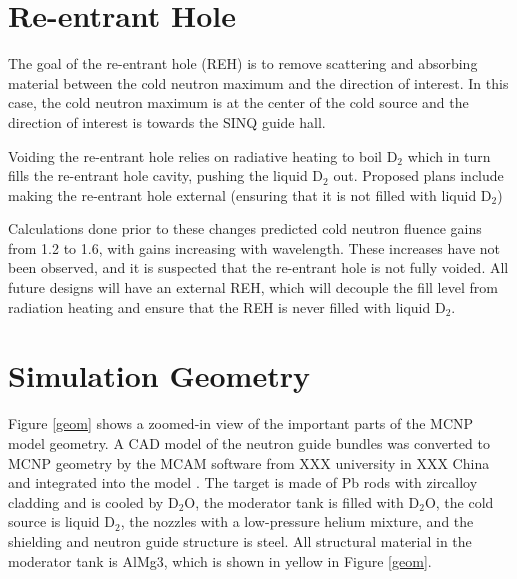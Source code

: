 \documentclass[a4paper]{jpconf}
\begin{document}
\section{Re-entrant Hole}

The goal of the re-entrant hole (REH) is to remove scattering and absorbing material between the cold neutron maximum and the direction of interest.  In this case, the cold neutron maximum is at the center of the cold source and the direction of interest is towards the SINQ guide hall.  

Voiding the re-entrant hole relies on radiative heating to boil D$_2$ which in turn fills the re-entrant hole cavity, pushing the liquid D$_2$ out.  Proposed plans include making the re-entrant hole external (ensuring that it is not filled with liquid D$_2$)

Calculations done prior to these changes predicted cold neutron fluence gains from 1.2 to 1.6, with gains increasing with wavelength. These increases have not been observed, and it is suspected that the re-entrant hole is not fully voided.  All future designs will have an external REH, which will decouple the fill level from radiation heating and ensure that the REH is never filled with liquid D$_2$.

\section{Simulation Geometry}

Figure \ref{geom} shows a zoomed-in view of the important parts of the MCNP model geometry.  A CAD model of the neutron guide bundles was converted to MCNP geometry by the MCAM software from XXX university in XXX China and integrated into the model \cite{mcam}.  The target is made of Pb rods with zircalloy cladding and is cooled by D$_2$O, the moderator tank is filled with D$_2$O, the cold source is liquid D$_2$, the nozzles with a low-pressure helium mixture, and the shielding and neutron guide structure is steel.  All structural material in the moderator tank is AlMg3, which is shown in yellow in Figure \ref{geom}.
\end{document}
